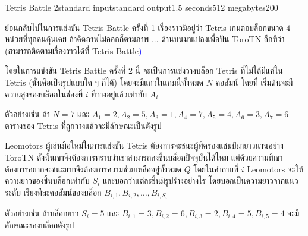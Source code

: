 \documentclass[11pt,a4paper]{article}
\begin{document}
\begin{problem}{Tetris Battle 2}{standard input}{standard output}{1.5 seconds}{512 megabytes}{200}

ย้อนกลับไปในการแข่งขัน Tetris Battle ครั้งที่ 1 เรื่องราวมีอยู่ว่า Tetris เกมต่อบล็อกขนาด $4$ หน่วยที่ทุกคนคุ้นเคย ถ้าคิดภาพไม่ออกก็ตามภาพ ... ด้านบนมาแปลงเพื่อปั่น ToroTN อีกทีว่า (สามารถติดตามเรื่องราวได้ที่ \textcolor{blue}{\href{https://api.otog.cf/problem/doc/844}{Tetris Battle})}

โดยในการแข่งขัน Tetris Battle ครั้งที่ 2 นี้ จะเป็นการแข่งวางบล็อก Tetris ที่ไม่ได้มีแค่ใน Tetris (นั่นคือเป็นรูปแบบใด ๆ ก็ได้) โดยจะมีแถวในเกมนี้ทั้งหมด $N$ คอลัมน์ โดยที่ เริ่มต้นจะมีความสูงของบล็อกในช่องที่ $i$ ที่วางอยู่แล้วเท่ากับ $A_i$

ตัวอย่างเช่น ถ้า $N=7$ และ $A_1=2,A_2=5,A_3=1,A_4=7,A_5=4,A_6=3,A_7=6$ ตารางของ Tetris ที่ถูกวางแล้วจะมีลักษณะเป็นดังรูป
\begin{center}
\parindent {}
\end{center}

Leomotors ผู้เล่นมือใหม่ในการแข่งขัน Tetris ต้องการจะชนะผู้ที่ครองแชมป์มายาวนานอย่าง ToroTN ดังนั้นเขาจึงต้องการทราบว่าเขาสามารถลงชิ้นบล็อกปัจจุบันได้ไหม แต่ด้วยความที่เขาต้องการอยากจะชนะมากจึงต้องการความช่วยเหลืออยู่ทั้งหมด $Q$ โดยในคำถามที่ $i$ Leomotors จะให้ความยาวของชิ้นบล็อกเท่ากับ $S_i$ และบอกว่าแต่ละชิ้นมีรูปร่างอย่างไร โดยบอกเป็นความยาวจากแนวระดับ เรียงทีละคอลัมน์ของบล็อก $B_{i,1},B_{i,2},\ldots,B_{i,S_i}$

ตัวอย่างเช่น ถ้าบล็อกยาว $S_i=5$ และ $B_{i,1}=3,B_{i,2}=6,B_{i,3}=2,B_{i,4}=5,B_{i,5}=4$ จะมีลักษณะของบล็อกดังรูป
\begin{center}
\parindent {}
\end{center}


\end{problem}
\end{document}

